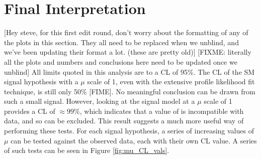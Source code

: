\FloatBarrier
\section{Final Interpretation}

    [Hey steve, for this first edit round, don't worry about the formatting of any of the plots in this section.
    They all need to be replaced when we unblind, and we've been updating their format a lot. (these are pretty old)]
    [FIXME: literally all the plots and numbers and conclusions here need to be updated once we unblind]
    All limits quoted in this analysis are to a CL of 95\%.
    The CL of the SM signal hypothesis with a $\mu$ scale of 1,
        even with the extensive profile likelihood fit technique, is still only 50\% [FIME].
    No meaningful conclusion can be drawn from such a small signal.
    However, looking at the  signal model at a $\mu$ scale of 1 provides a CL of $\approx 99\%$,
        which indicates that a value of  is incompatible with data, and so can be excluded.
    This result suggests a much more useful way of performing these tests.
    For each signal hypothesis, a series of increasing values of $\mu$ can be tested against the observed data,
        each with their own CL value.
    A series of such tests can be seen in Figure \ref{fig:mu_CL_vals}.

